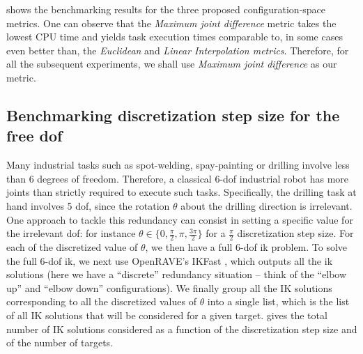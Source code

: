  shows the benchmarking results for the
three proposed configuration-space metrics. One can observe that the
\textit{Maximum joint difference} metric takes the lowest CPU time and
yields task execution times comparable to, in some cases even better
than, the \textit{Euclidean} and \textit{Linear Interpolation
  metrics}. Therefore, for all the subsequent experiments, we shall
use \textit{Maximum joint difference} as our metric.

\subsection{Benchmarking discretization step size for the free \ac{dof}}
\label{sub:discrete_benchmark}

Many industrial tasks such as spot-welding, spay-painting or drilling involve
less than 6 degrees of freedom. Therefore, a classical 6-\ac{dof} industrial
robot has more joints than strictly required to execute such tasks.
Specifically, the drilling task at hand involves 5 \ac{dof}, since the rotation
$\theta$ about the drilling direction is irrelevant. One approach to tackle this
redundancy can consist in setting a specific value for the irrelevant \ac{dof}:
for instance $\theta \in \{0, \frac{\pi}{2}, \pi, \frac{3\pi}{2}\}$ for a
$\frac{\pi}{2}$ discretization step size. For each of the discretized value of
$\theta$, we then have a full 6-\ac{dof} \ac{ik} problem. To solve the full
6-\ac{dof} \ac{ik}, we next use OpenRAVE's IKFast \cite{diankov2010}, which
outputs all the \ac{ik} solutions (here we have a \enquote{discrete} redundancy
situation -- think of the \enquote{elbow up} and \enquote{elbow down}
configurations). We finally group all the IK solutions corresponding to all the
discretized values of $\theta$ into a single list, which is the list of all IK
solutions that will be considered for a given target. 
gives the total number of IK solutions considered as a function of the
discretization step size and of the number of targets.

